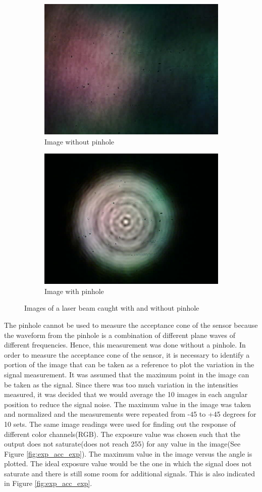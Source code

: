 \begin{figure}[ht]
    \centering
    \begin{subfigure}{0.5\textwidth}
    \centering
        \includegraphics[width=0.5\linewidth]{pics/withoutPinhole.jpg}
        \caption{Image without pinhole}
        \label{fig:nopinhole}
    \end{subfigure}%
    \begin{subfigure}{0.5\textwidth}
    \centering
        \includegraphics[width=0.5\linewidth]{pics/withPinhole.jpg}
        \caption{Image with pinhole}
        \label{fig:pinhole}
    \end{subfigure}
    \caption{Images of a laser beam caught with and without pinhole}
    \label{fig:pinholeDiff}
    \end{figure}
The pinhole cannot be used to measure the acceptance cone of the sensor because the waveform from the pinhole is a combination of different plane waves of different frequencies. Hence, this measurement was done without a pinhole. In order to measure the acceptance cone of the sensor, it is necessary to identify a portion of the image that can be taken as a reference to plot the variation in the signal measurement. It was assumed that the maximum point in the image can be taken as the signal. Since there was too much variation in the intensities measured, it was decided that we would average the 10 images in each angular position to reduce the signal noise. The maximum value in the image was taken and normalized and the measurements were repeated from -45 to +45 degrees for 10 sets. The same image readings were used for finding out the response of different color channels(RGB). The exposure value was chosen such that the output does not saturate(does not reach 255) for any value in the image(See Figure \ref{fig:exp_acc_exp}). The maximum value in the image versus the angle is plotted. The ideal exposure value would be the one in which the signal does not saturate and there is still some room for additional signals. This is also indicated in Figure \ref{fig:exp_acc_exp}.
